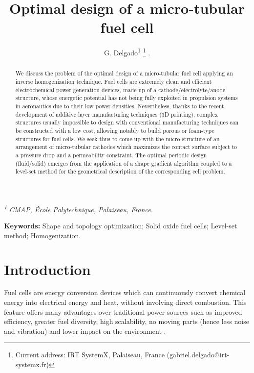\documentclass{article}
\begin{document}
\title{Optimal design of a micro-tubular fuel cell}
\author{
G. Delgado\textsuperscript{1}
\footnote{Current address: IRT SystemX, Palaiseau, France (gabriel.delgado@irt-systemx.fr)}
.
}
\maketitle
\begin{center}
\emph{
\textsuperscript{1} 
CMAP, \'Ecole Polytechnique, Palaiseau, France.
}

\end{center}

\begin{abstract}
We discuss the problem of the optimal design of a micro-tubular fuel cell applying an inverse homogenization technique. Fuel cells are extremely clean and efficient electrochemical power generation devices, made up of a cathode/electrolyte/anode structure, whose energetic potential has not being fully exploited in propulsion systems in aeronautics due to their low power densities. Nevertheless, thanks to the recent development of additive layer manufacturing techniques (3D printing), 
complex structures usually impossible to design with conventional manufacturing techniques 
can be constructed with a low cost, allowing notably to build porous or foam-type structures for fuel cells. We seek thus to come up with the micro-structure of an arrangement of micro-tubular cathodes which maximizes the contact surface {subject} to a pressure drop and a permeability constraint. The optimal periodic design (fluid/solid) emerges from the application of a shape gradient algorithm coupled to a level-set method for the geometrical description of the corresponding cell problem.\\

\end{abstract}


\noindent
{\bf Keywords:} 
Shape and topology optimization;
Solid oxide fuel cells; Level-set method; Homogenization.

\section{Introduction}

Fuel cells are energy conversion devices which can continuously convert chemical energy into electrical energy and heat, without involving direct combustion. This feature offers many advantages over traditional power sources such as improved efficiency, greater fuel diversity, high scalability, no moving parts (hence less noise and vibration) and lower impact on the environment \cite{gou2009fuel}.
 
\end{document}
